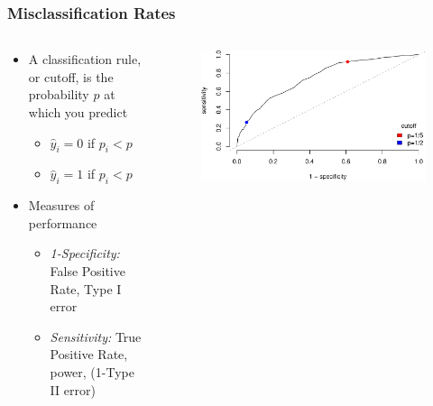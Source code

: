 \documentclass[
  shownotes,
  xcolor={svgnames},
  hyperref={colorlinks,citecolor=DarkBlue,linkcolor=DarkRed,urlcolor=DarkBlue}
  , aspectratio=169]{beamer}
\begin{document}
\begin{frame}[fragile]
\frametitle{Misclassification Rates}




\begin{columns}[T] %
\begin{column}{.52\textwidth}
\begin{itemize}
  \item A classification rule, or cutoff, is the probability $p$ at which you predict
  \medskip
  \begin{itemize}
    \item $\hat y_i =0$ if $p_i < p$
    \item $\hat y_i = 1$ if $p_i < p$
  \end{itemize}
  \medskip

  \item Measures of performance
  \begin{itemize}
  \item {\it 1-Specificity:} False Positive Rate, Type I error
  \item {\it Sensitivity:} True Positive Rate, power, (1-Type II error)
  \end{itemize}
  
\end{itemize}
\end{column}  
\hfill
\begin{column}{.48\textwidth}

 \begin{figure}[H] \centering
            \captionsetup{justification=centering}
              \includegraphics[scale=0.4]{figures/roc}                            
 \end{figure}

\end{column}
\end{columns}

\end{frame}
\end{document}
